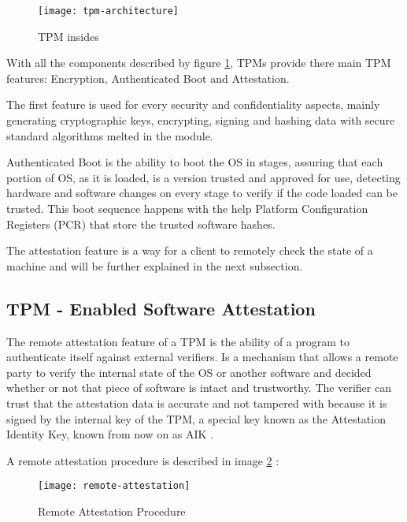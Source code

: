 \begin{figure}[htbp]
	\centering
	{\texttt{[image: tpm-architecture]}}%
	\caption{TPM insides}
	\label{fig:tpm_architecture}
\end{figure}


With all the components described by figure \ref{fig:tpm_architecture}, \glspl{TPM} provide there main \gls{TPM} features: Encryption, Authenticated Boot and Attestation. 

The first feature is used for every security and confidentiality aspects, mainly generating cryptographic keys, encrypting, signing and hashing data with secure standard algorithms melted in the module.

Authenticated Boot is the ability to boot the \gls{OS} in stages, assuring that each portion of OS, as it is loaded, is a version trusted and approved for use, detecting hardware and software changes on every stage to verify if the code loaded can be trusted. This boot sequence happens with the help Platform Configuration Registers (\gls{PCR}) that store the trusted software hashes.

The attestation feature is a way for a client to remotely check the state of a machine and will be further explained in the next subsection.

\subsection{TPM - Enabled Software Attestation} %
\label{ssec:enabled_software_attestation}

The remote attestation feature of a \gls{TPM} is the ability of a program to authenticate itself against external verifiers. Is a mechanism that allows a remote party to verify the internal state of the OS or another software and decided whether or not that piece of software is intact and trustworthy. The verifier can trust that the attestation data is accurate and not tampered with because it is signed by the internal key of the \gls{TPM}, a special key known as the Attestation Identity Key, known from now on as \gls{AIK} \cite{attestation:aik}.

A remote attestation procedure is described in image \ref{fig:remote-attestation} \cite{attestation:1}: 

\begin{figure}[htbp]
	\centering
	{\texttt{[image: remote-attestation]}}%
	\caption{Remote Attestation Procedure}
	\label{fig:remote-attestation}
\end{figure}

